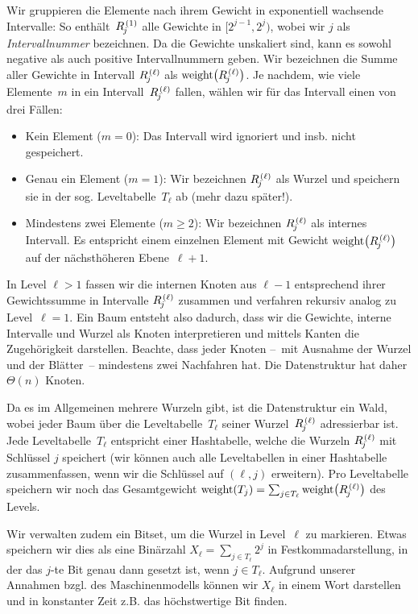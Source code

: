 Wir \aside{$\rng{\ell}{j}$: Intervall $[2^{j-1}, 2^j)$ auf Ebene~$\ell$} gruppieren die Elemente nach ihrem Gewicht in exponentiell wachsende Intervalle:
So enthält~$\rng{1}{j}$ alle Gewichte in $[2^{j-1}, 2^j)$, wobei wir $j$ als \emph{Intervallnummer}  bezeichnen.
Da die Gewichte unskaliert sind, kann es sowohl negative als auch positive Intervallnummern geben.
Wir bezeichnen die Summe aller Gewichte in Intervall $\rng{\ell}{j}$ als $\wrng{\ell}{j}$.
Je  nachdem, wie viele Elemente~$m$ in ein Intervall~$\rng{\ell}{j}$ fallen, wählen wir für das Intervall einen von drei Fällen:
\begin{itemize}
    \item Kein Element ($m=0$): Das Intervall wird ignoriert und insb. nicht gespeichert.
    \item Genau ein Element ($m=1$): Wir bezeichnen $\rng{\ell}{j}$ als Wurzel und speichern sie in der sog. Leveltabelle~$T_\ell$ ab (mehr dazu später!).
    \item Mindestens zwei Elemente ($m \ge 2$): Wir bezeichnen $\rng{\ell}{j}$ als internes Intervall.
          Es entspricht einem einzelnen Element mit Gewicht $\wrng{\ell}{j}$ auf der nächsthöheren Ebene~$\ell + 1$.
\end{itemize}

In Level $\ell > 1$ fassen wir die internen Knoten aus $\ell - 1$ entsprechend ihrer Gewichtssumme in Intervalle $\rng{\ell}{j}$ zusammen und verfahren rekursiv analog zu Level~$\ell = 1$.
Ein Baum entsteht also dadurch, dass wir die Gewichte, interne Intervalle und Wurzel als Knoten interpretieren und mittels Kanten die Zugehörigkeit darstellen.
Beachte, dass jeder Knoten --~mit Ausnahme der Wurzel und der Blätter~-- mindestens zwei Nachfahren hat.
Die Datenstruktur hat daher $\Theta(n)$ Knoten.

Da  es im Allgemeinen mehrere Wurzeln gibt, ist die Datenstruktur ein Wald, wobei jeder Baum über die Leveltabelle~$T_\ell$ seiner Wurzel~$\rng{\ell}{j}$ adressierbar ist.
Jede Leveltabelle~$T_\ell$ entspricht einer Hashtabelle, welche die Wurzeln $\rng{\ell}{j}$ mit Schlüssel $j$ speichert (wir können auch alle Leveltabellen in einer Hashtabelle zusammenfassen, wenn wir die Schlüssel auf $(\ell, j)$ erweitern).
Pro Leveltabelle speichern wir noch das Gesamtgewicht $\wght(T_j) = \sum_{j \in T_\ell} \wrng{\ell}{j}$ des Levels.

Wir verwalten zudem ein Bitset, um die Wurzel in Level~$\ell$ zu markieren.
Etwas  speichern wir dies als eine Binärzahl $X_\ell = \sum_{j \in T_\ell} 2^j$ in Festkommadarstellung, in der das $j$-te Bit genau dann gesetzt ist, wenn $j \in T_\ell$.
Aufgrund unserer Annahmen bzgl. des Maschinenmodells können wir $X_\ell$ in einem Wort darstellen und in konstanter Zeit z.B. das höchstwertige Bit finden.

